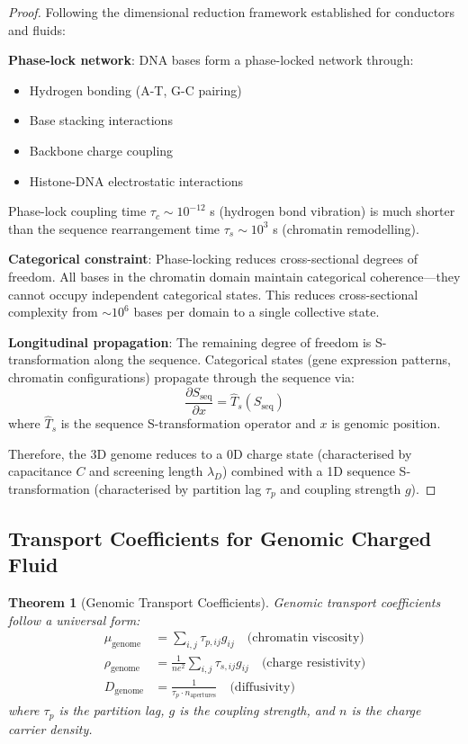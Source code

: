 \documentclass[11pt,a4paper]{article}
\newtheorem{theorem}{Theorem}[section]
\theoremstyle{remark}
\begin{document}
\begin{proof}
Following the dimensional reduction framework established for conductors and fluids:

\textbf{Phase-lock network}: DNA bases form a phase-locked network through:
\begin{itemize}
\item Hydrogen bonding (A-T, G-C pairing)
\item Base stacking interactions
\item Backbone charge coupling
\item Histone-DNA electrostatic interactions
\end{itemize}
Phase-lock coupling time $\tau_c \sim 10^{-12}$ s (hydrogen bond vibration) is much shorter than the sequence rearrangement time $\tau_s \sim 10^3$ s (chromatin remodelling).

\textbf{Categorical constraint}: Phase-locking reduces cross-sectional degrees of freedom. All bases in the chromatin domain maintain categorical coherence—they cannot occupy independent categorical states. This reduces cross-sectional complexity from $\sim 10^6$ bases per domain to a single collective state.

\textbf{Longitudinal propagation}: The remaining degree of freedom is S-transformation along the sequence. Categorical states (gene expression patterns, chromatin configurations) propagate through the sequence via:
\begin{equation}
\frac{\partial S_{\text{seq}}}{\partial x} = \hat{T}_s(S_{\text{seq}})
\end{equation}
where $\hat{T}_s$ is the sequence S-transformation operator and $x$ is genomic position.

Therefore, the 3D genome reduces to a 0D charge state (characterised by capacitance $C$ and screening length $\lambda_D$) combined with a 1D sequence S-transformation (characterised by partition lag $\tau_p$ and coupling strength $g$).
\end{proof}

\subsection{Transport Coefficients for Genomic Charged Fluid}

\begin{theorem}[Genomic Transport Coefficients]
\label{thm:genomic_transport}
Genomic transport coefficients follow a universal form:
\begin{align}
\mu_{\text{genome}} &= \sum_{i,j} \tau_{p,ij} g_{ij} \quad \text{(chromatin viscosity)} \\
\rho_{\text{genome}} &= \frac{1}{ne^2}\sum_{i,j} \tau_{s,ij} g_{ij} \quad \text{(charge resistivity)} \\
D_{\text{genome}} &= \frac{1}{\tau_p \cdot n_{\text{apertures}}} \quad \text{(diffusivity)}
\end{align}
where $\tau_p$ is the partition lag, $g$ is the coupling strength, and $n$ is the charge carrier density.
\end{theorem}
\end{document}
